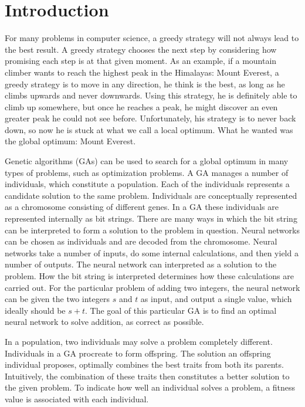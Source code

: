 \section{Introduction}
For many problems in computer science, a greedy strategy will not always lead to the best result. A greedy strategy chooses the next step by considering how promising each step is at that given moment. As an example, if a mountain climber wants to reach the highest peak in the Himalayas: Mount Everest, a greedy strategy is to move in any direction, he think is the best, as long as he climbs upwards and never downwards. Using this strategy, he is definitely able to climb up somewhere, but once he reaches a peak, he might discover an even greater peak he could not see before. Unfortunately, his strategy is to never back down, so now he is stuck at what we call a local optimum. What he wanted was the global optimum: Mount Everest.
 
Genetic algorithms (GAs) can be used to search for a global optimum in many types of problems, such as optimization problems. A GA manages a number of individuals, which constitute a population. Each of the individuals represents a candidate solution to the same problem. Individuals are conceptually represented as a chromosome consisting of different genes. In a GA these individuals are represented internally as bit strings. There are many ways in which the bit string can be interpreted to form a solution to the problem in question. Neural networks can be chosen as individuals and are decoded from the chromosome. Neural networks take a number of inputs, do some internal calculations, and then yield a number of outputs.
The neural network can interpreted as a solution to the problem.
How the bit string is interpreted determines how these calculations are carried out. For the particular problem of adding two integers, the neural network can be given the two integers $s$ and $t$ as input, and output a single value, which ideally should be $s+t$. The goal of this particular GA is to find an optimal neural network to solve addition, as correct as possible.

In a population, two individuals may solve a problem completely different. Individuals in a GA procreate to form offspring. The solution an offspring individual proposes, optimally combines the best traits from both its parents. Intuitively, the combination of these traits then constitutes a better solution to the given problem. To indicate how well an individual solves a problem, a fitness value is associated with each individual.

